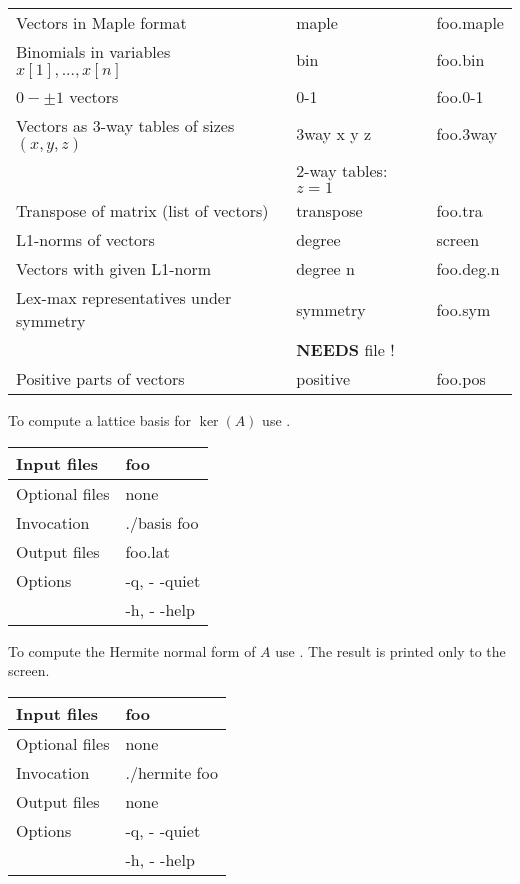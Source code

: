 \documentclass[12pt]{article}
\newcommand\File{\begingroup \urlstyle{sf}\Url}
\theoremstyle{definition}
\newcommand{\important}{\textbf}
\begin{document}
\begin{tabular}{|l|l|l|}
\hline
Vectors in Maple format & maple & foo.maple\\
Binomials in variables $x[1],...,x[n]$ & bin & foo.bin\\
$0-\pm 1$ vectors & 0-1 & foo.0-1\\
Vectors as $3$-way tables of sizes $(x,y,z)$ & 3way x y z & foo.3way\\ 
	& $2$-way tables: $z=1$ &\\
Transpose of matrix (list of vectors) & transpose & foo.tra\\
L1-norms of vectors & degree & screen\\
Vectors with given L1-norm & degree n & foo.deg.n\\
Lex-max representatives under symmetry & symmetry & foo.sym\\
	& \important{NEEDS} file \File{foo.sym}! &\\
Positive parts of vectors & positive & foo.pos\\
\hline
\end{tabular}

To compute a lattice basis for $\ker(A)$ use \File{basis}.

\begin{center}
\begin{tabular}{|l|l|}
\hline
Input files    & foo \\
\hline
Optional files & none \\
\hline
Invocation     & ./basis foo \\
Output files   & foo.lat     \\
\hline
Options        & -q, - -quiet \\
	       & -h, - -help \\
\hline
\end{tabular}
\end{center}


To compute the Hermite normal form of $A$ use \File{basis}. The result 
is printed only to the screen.

\begin{center}
\begin{tabular}{|l|l|}
\hline
Input files    & foo \\
\hline
Optional files & none \\
\hline
Invocation     & ./hermite foo \\
Output files   & none     \\
\hline
Options        & -q, - -quiet \\
	       & -h, - -help \\
\hline
\end{tabular}
\end{center}
\end{document}
